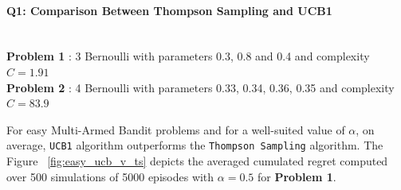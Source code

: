 \documentclass[11pt]{article}
\numberwithin{figure}{section} %
\begin{document}
\paragraph{Q1: Comparison Between Thompson Sampling and UCB1}\mbox{}\\
\textbf{Problem 1} : 3 Bernoulli with parameters 0.3, 0.8 and 0.4 and complexity $C = 1.91$ \\
\textbf{Problem 2} : 4 Bernoulli with parameters 0.33, 0.34, 0.36, 0.35 and complexity $C = 83.9$

For easy Multi-Armed Bandit problems and for a well-suited value of $\alpha$,  on average, \texttt{UCB1} algorithm outperforms the \texttt{Thompson Sampling} algorithm. The Figure ~\ref{fig:easy_ucb_v_ts} depicts the averaged cumulated regret computed over 500 simulations of 5000 episodes with $\alpha = 0.5$ for \textbf{Problem 1}.
\end{document}

